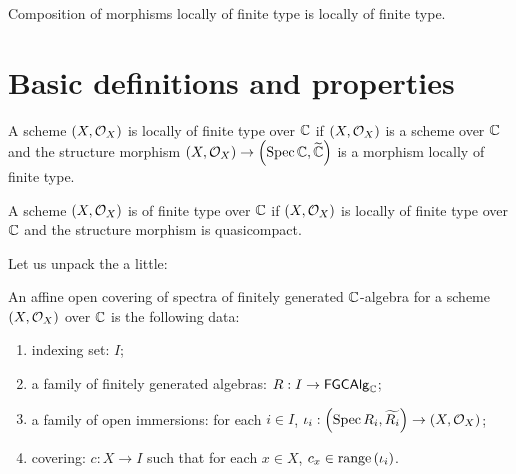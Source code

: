 \begin{proposition}\label{thm:locally_of_finite_type_comp}
  Composition of morphisms locally of finite type is locally of finite type.
\end{proposition}

\section{Basic definitions and properties}

\begin{definition}\label{def:SchemeLocallyOfFiniteType}
  A scheme $\left(X, \mathcal{O}_{X}\right)$ is locally of finite type over $\mathbb{C}$ if $\left(X, \mathcal{O}_{X}\right)$ is a scheme over $\mathbb{C}$ and the structure morphism $\left(X, \mathcal{O}_{X}\right) \to \left(\operatorname*{Spec}{\mathbb{C}}, \widetilde{\mathbb{C}}\right)$ is a morphism locally of finite type.
\end{definition}

\begin{definition}
  A scheme $\left(X, \mathcal{O}_{X}\right)$ is of finite type over $\mathbb{C}$ if $\left(X, \mathcal{O}_{X}\right)$ is locally of finite type over $\mathbb{C}$ and the structure morphism is quasicompact.

\end{definition}

Let us unpack the  a little:


\begin{definition}
  An affine open covering of spectra of finitely generated $\mathbb{C}$-algebra for a scheme $\left(X, \mathcal{O}_{X}\right)$ over $\mathbb{C}$ is the following data:
    \begin{enumerate}
        \item indexing set: $I$;
        \item a family of finitely generated algebras: $R : I \to \mathsf{FGCAlg}_{\mathbb{C}}$;
        \item a family of open immersions: for each $i \in I$, $\iota_i: \left(\operatorname*{Spec}{R_i}, \widetilde{R_i}\right) \to \left(X, \mathcal{O}_{X}\right)$;
        \item covering: $c : X \to I$ such that for each $x \in X$, $c_x \in \operatorname*{range}\left({\iota_i}\right)$.
    \end{enumerate}
\end{definition}

